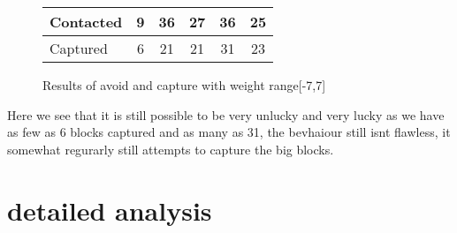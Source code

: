 \documentclass[12pt, a4paper]{article}
\begin{document}
\begin{figure}[H]
	\begin{center}
		\begin{tabular}{l | c | c |c |c |c }
		 Contacted& 9 & 36 & 27 & 36 & 25\\ \hline
		 Captured & 6 & 21 & 21 & 31 & 23\\
		 
		\end{tabular}
	\end{center}
	\caption{Results of avoid and capture with weight range[-7,7]}
\end{figure}

Here we see that it is still possible to be very unlucky and very lucky as we have as few as 6 blocks captured and as many as 31, the bevhaiour still isnt flawless, it somewhat regurarly still attempts to capture the big blocks. 

\section{detailed analysis}
\end{document}
